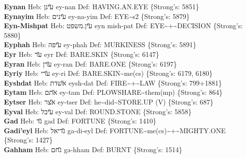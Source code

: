 {\textbf{Eynan} Heb: {\large\H עינן} ey-nan Def: HAVING.AN.EYE \{Strong's: 5851\}\hfill{}\\

\textbf{Eynayim} Heb: {\large\H עינים} ey-na-yim Def: EYE\textasciitilde{}s2 \{Strong's: 5879\}\hfill{}\\

\textbf{Eyn-Mishpat} Heb: {\large\H עין.משפט} eyn mish-pat Def: EYE\textasciitilde{}+\textasciitilde{}DECISION \{Strong's: 5880\}\hfill{}\\

\textbf{Eyphah} Heb: {\large\H עיפה} ey-phah Def: MURKINESS \{Strong's: 5891\}\hfill{}\\

\textbf{Eyr} Heb: {\large\H ער} eyr Def: BARE.SKIN \{Strong's: 6147\}\hfill{}\\

\textbf{Eyran} Heb: {\large\H ערן} ey-ran Def: BARE.ONE \{Strong's: 6197\}\hfill{}\\

\textbf{Eyriy} Heb: {\large\H ערי} ey-ri Def: BARE.SKIN\textasciitilde{}me(cs) \{Strong's: 6179, 6180\}\hfill{}\\

\textbf{Eyshdat} Heb: {\large\H אשדת} eysh-dat Def: FIRE\textasciitilde{}+\textasciitilde{}LAW \{Strong's: 799+1881\}\hfill{}\\

\textbf{Eytam} Heb: {\large\H אתם} ey-tam Def: PLOWSHARE\textasciitilde{}them(mp) \{Strong's: 864\}\hfill{}\\

\textbf{Eytser} Heb: {\large\H אצר} ey-tser Def: he\textasciitilde{}did\textasciitilde{}STORE.UP (V) \{Strong's: 687\}\hfill{}\\

\textbf{Eyval} Heb: {\large\H עיבל} ey-val Def: ROUND.STONE \{Strong's: 5858\}\hfill{}\\

\textbf{Gad} Heb: {\large\H גד} gad Def: FORTUNE \{Strong's: 1410\}\hfill{}\\

\textbf{Gadi'eyl} Heb: {\large\H גדיאל} ga-di-eyl Def: FORTUNE\textasciitilde{}me(cs)\textasciitilde{}+\textasciitilde{}MIGHTY.ONE \{Strong's: 1427\}\hfill{}\\

\textbf{Gahham} Heb: {\large\H גחם} ga-hham Def: BURNT \{Strong's: 1514\}\hfill{}\\

}
